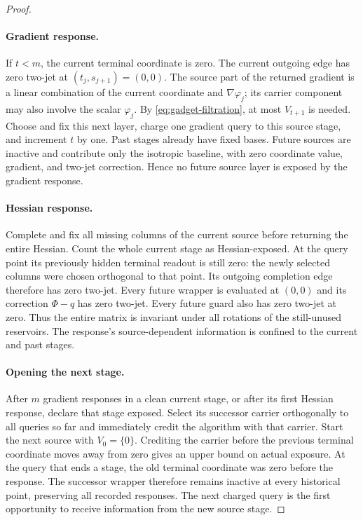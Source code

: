 \documentclass[11pt]{article}
\theoremstyle{remark}
\theoremstyle{remark}
\begin{document}
\begin{proof}
\paragraph{Gradient response.}
If $t<m$, the current terminal coordinate is zero. The current outgoing edge has zero two-jet at $(t_j,s_{j+1})=(0,0)$. The source part of the returned gradient is a linear combination of the current coordinate and $\nabla\varphi_j$; its carrier component may also involve the scalar $\varphi_j$. By \eqref{eq:gadget-filtration}, at most $V_{t+1}$ is needed. Choose and fix this next layer, charge one gradient query to this source stage, and increment $t$ by one. Past stages already have fixed bases. Future sources are inactive and contribute only the isotropic baseline, with zero coordinate value, gradient, and two-jet correction. Hence no future source layer is exposed by the gradient response.

\paragraph{Hessian response.}
Complete and fix all missing columns of the current source before returning the entire Hessian. Count the whole current stage as Hessian-exposed. At the query point its previously hidden terminal readout is still zero: the newly selected columns were chosen orthogonal to that point. Its outgoing completion edge therefore has zero two-jet. Every future wrapper is evaluated at $(0,0)$ and its correction $\Phi-q$ has zero two-jet. Every future guard also has zero two-jet at zero. Thus the entire matrix is invariant under all rotations of the still-unused reservoirs. The response's source-dependent information is confined to the current and past stages.

\paragraph{Opening the next stage.}
After $m$ gradient responses in a clean current stage, or after its first Hessian response, declare that stage exposed. Select its successor carrier orthogonally to all queries so far and immediately credit the algorithm with that carrier. Start the next source with $V_0=\{0\}$. Crediting the carrier before the previous terminal coordinate moves away from zero gives an upper bound on actual exposure. At the query that ends a stage, the old terminal coordinate was zero before the response. The successor wrapper therefore remains inactive at every historical point, preserving all recorded responses. The next charged query is the first opportunity to receive information from the new source stage.


\end{proof}
\end{document}
